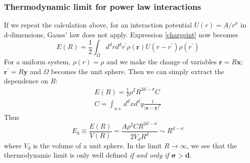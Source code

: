 \documentclass[12pt,titlepage]{article}
\numberwithin{equation}{section}
\begin{document}
\subsubsection{Thermodynamic limit for power law interactions}
If we repeat the calculation above, for an interaction potential $U(r)=A/r^{\sigma}$ in d-dimensions, Gauss' law does not apply. Expression \ref{chargeint} now becomes
\begin{equation}
    E(R) = \frac{1}{2}\int_{\Omega}d^drd^dr^{\prime}\rho(\boldsymbol{r})U(r-r^{\prime})\rho(r^{\prime})
\end{equation}
For a uniform system, $\rho(r)=\rho$ and we make the change of variables $\boldsymbol{r}=R\boldsymbol{x}$;$\boldsymbol{r^{\prime}}=R\boldsymbol{y}$ and $\Omega$ becomes the unit sphere. Then we can simply extract the dependence on $R$:
\begin{equation}
\begin{split}
    E(R) = \frac{1}{2}\rho^2R^{2d-\sigma}C\\
    C = \int_{u.s.}d^dxd^dy\frac{1}{|\boldsymbol{x}-\boldsymbol{y}|^{\sigma}}
\end{split}
\end{equation}
Thus
\begin{equation}
    E_b\equiv\frac{E(R)}{V(R)} = \frac{A\rho^2CR^{2d-\sigma}}{2V_dR^d}\sim R^{d-\sigma}
\end{equation}
where $V_d$ is the volume of a unit sphere. In the limit $R\rightarrow\infty$, we see that the thermodynamic limit is only well defined \emph{if and only if $\boldsymbol{\sigma>d}$}.
\end{document}
